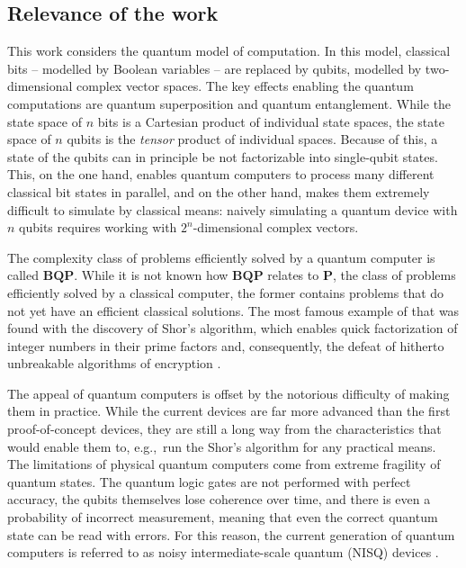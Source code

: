 
\subsection*{Relevance of the work} 

This work considers the quantum model of computation. In this model, classical bits -- modelled by Boolean variables -- are replaced by qubits, modelled by two-dimensional complex vector spaces. The key effects enabling the quantum computations are quantum superposition and quantum entanglement. While the state space of $n$ bits is a Cartesian product of individual state spaces, the state space of $n$ qubits is the \textit{tensor} product of individual spaces. Because of this, a state of the qubits can in principle be not factorizable into single-qubit states. This, on the one hand, enables quantum computers to process many different classical bit states in parallel, and on the other hand, makes them extremely difficult to simulate by classical means: naively simulating a quantum device with $n$ qubits requires working with $2^n$-dimensional complex vectors.

The complexity class of problems efficiently solved by a quantum computer is called $\mathbf{BQP}$. While it is not known how $\mathbf{BQP}$ relates to $\mathbf{P}$, the class of problems efficiently solved by a classical computer, the former contains problems that do not yet have an efficient classical solutions. The most famous example of that was found with the discovery of Shor's algorithm, which enables quick factorization of integer numbers in their prime factors and, consequently, the defeat of hitherto unbreakable algorithms of encryption \cite{nielsen_quantum_2010}.

The appeal of quantum computers is offset by the notorious difficulty of making them in practice. While the current devices are far more advanced than the first proof-of-concept devices, they are still a long way from the characteristics that would enable them to, e.g.,~run the Shor's algorithm for any practical means. 
The limitations of physical quantum computers come from extreme fragility of quantum states. The quantum logic gates are not performed with perfect accuracy, the qubits themselves lose coherence over time, and there is even a probability of incorrect measurement, meaning that even the correct quantum state can be read with errors. For this reason, the current generation of quantum computers is referred to as noisy intermediate-scale quantum (NISQ) devices \cite{bharti_noisy_2021}.

